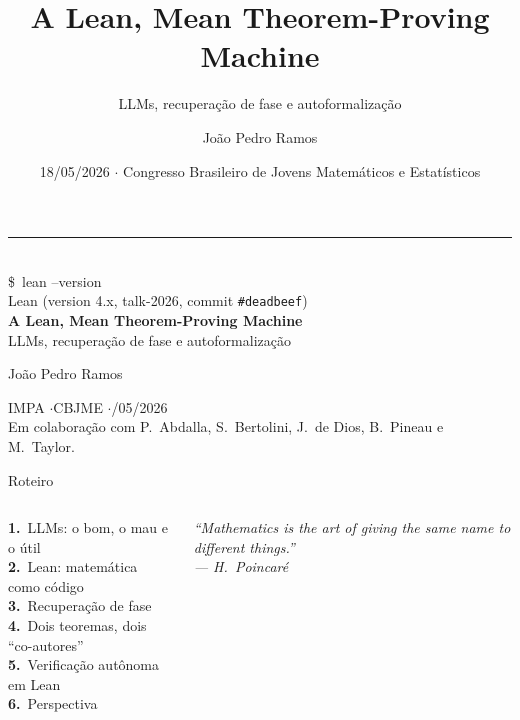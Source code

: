 \documentclass[10pt,aspectratio=169]{beamer}
\title{\textbf{A Lean, Mean Theorem-Proving Machine}}
\subtitle{LLMs, recuperação de fase e autoformalização}
\author{João Pedro Ramos}
\institute{IMPA}
\date{18/05/2026 $\cdot$ Congresso Brasileiro de Jovens Matemáticos e Estatísticos}
\begin{document}

\begin{frame}
  \vspace{0.6em}
  {\color{accent}\rule{0.25\linewidth}{0.5pt}}\\[0.4em]
  {\color{fgmute}\ttfamily\small \$\ lean --version}\\
  {\color{fgmute}\ttfamily\small Lean (version 4.x, talk-2026, commit \texttt{\#deadbeef})}\\[1em]
  {\LARGE\bfseries A \textcolor{accent}{Lean}, Mean Theorem-Proving Machine}\\[0.5em]
  {\large\color{fgmute} LLMs, recuperação de fase e autoformalização}\\[1.5em]
  {\normalsize João Pedro Ramos\par}
  {\small\color{fgmute} IMPA \quad$\cdot$\quad CBJME \quad$\cdot$/05/2026}\\[1em]
  {\color{fgmute}\footnotesize Em colaboração com P.~Abdalla, S.~Bertolini, J.~de Dios, B.~Pineau e M.~Taylor.}
\end{frame}

\begin{frame}{Roteiro}
  \vspace{0.4em}
  \begin{columns}[T]
    \textbf{\color{accent}1.}\ LLMs: o bom, o mau e o útil\\[0.6em]
    \textbf{\color{accent}2.}\ Lean: matemática como código\\[0.6em]
    \textbf{\color{accent}3.}\ Recuperação de fase\\[0.6em]
    \textbf{\color{accent}4.}\ Dois teoremas, dois ``co-autores''\\[0.6em]
    \textbf{\color{accent}5.}\ Verificação autônoma em Lean\\[0.6em]
    \textbf{\color{accent}6.}\ Perspectiva

    \begin{tcolorbox}[colback=bgpanel,colframe=rule,coltext=fgmain,
                       arc=2pt,boxrule=0.4pt,left=8pt,right=8pt,top=8pt,bottom=8pt]
      \footnotesize\itshape\color{fgmute}
      ``Mathematics is the art of giving the same name to different things.''\\[0.3em]
      \hfill --- H.~Poincaré
    \end{tcolorbox}
  \end{columns}
\end{frame}
\end{document}
